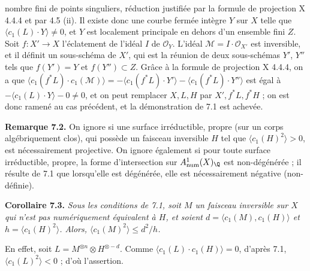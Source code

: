 nombre fini de points singuliers, r\'eduction justifi\'ee par la formule de projection X 4.4.4 et par 4.5 (ii). Il existe donc une courbe ferm\'ee int\`egre $Y$ sur $X$ telle que $\langle c_1(L)\cdot Y\rangle\ne0$, et $Y$ est localement principale en dehors d'un ensemble fini $Z$. Soit $f:X'\to X$ l'\'eclatement de l'id\'eal $I$ de $\mathcal O_Y$. L'id\'eal $\mathcal M=I\cdot\mathcal O_{X'}$ est inversible, et il d\'efinit un sous-sch\'ema de $X'$, qui est la r\'eunion de deux sous-sch\'emas $Y'$, $Y''$ tels que $f(Y')=Y$ et $f(Y'')\subset Z$. Gr\^ace \`a la formule de projection X 4.4.4, on a que $\langle c_1(f^*L)\cdot c_1(\mathcal M)\rangle=-\langle c_1(f^*L)\cdot Y'\rangle-\langle c_1(f^*L)\cdot Y''\rangle$ est \'egal \`a $-\langle c_1(L)\cdot Y\rangle-0\ne0$, et on peut remplacer $X,L,H$ par $X',f^*L,f^*H$ ; on est donc ramen\'e au cas pr\'ec\'edent, et la d\'emonstration de 7.1 est achev\'ee.

\textbf{Remarque 7.2.} On ignore si une surface irr\'eductible, propre (sur un corps alg\'ebriquement clos), qui poss\`ede un faisceau inversible $H$ tel que $\langle c_1(H)^2\rangle>0$, est n\'ecessairement projective. On ignore \'egalement si pour toute surface irr\'eductible, propre, la forme d'intersection sur $A^1_{\mathrm{num}}(X)_{\Q}$ est non-d\'eg\'en\'er\'ee ; il r\'esulte de 7.1 que lorsqu'elle est d\'eg\'en\'er\'ee, elle est n\'ecessairement n\'egative (non-d\'efinie).

\textbf{Corollaire 7.3.} \emph{Sous les conditions de 7.1, soit $M$ un faisceau inversible sur $X$ qui n'est pas num\'eriquement \'equivalent \`a $H$, et soient $d=\langle c_1(M),c_1(H)\rangle$ et $h=\langle c_1(H)^2\rangle$. Alors, $\langle c_1(M)^2\rangle\leq d^2/h$.}

En effet, soit $L=M^{\otimes n}\otimes H^{\otimes -d}$. Comme $\langle c_1(L)\cdot c_1(H)\rangle=0$, d'apr\`es 7.1, $\langle c_1(L)^2\rangle<0$ ; d'o\`u l'assertion.

